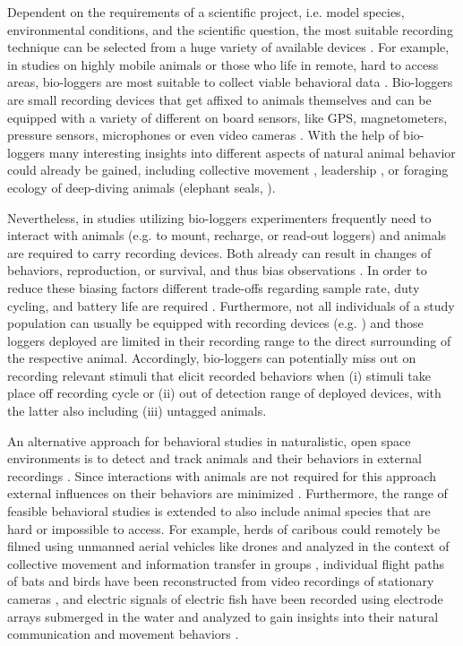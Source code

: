 \documentclass[11pt,pdftex]{article}
\begin{document}
Dependent on the requirements of a scientific project, i.e. model species, environmental conditions, and the scientific question, the most suitable recording technique can be selected from a huge variety of available devices \citep{Hughey2018}. For example, in studies on highly mobile animals or those who life in remote, hard to access areas, bio-loggers are most suitable to collect viable behavioral data \citep{Nagy2010, StrandburgPeshkin2017}. Bio-loggers are small recording devices that get affixed to animals themselves and can be equipped with a variety of different on board sensors, like GPS, magnetometers, pressure sensors, microphones or even video cameras \citep{Hughey2018}. With the help of bio-loggers many interesting insights into different aspects of natural animal behavior could already be gained, including collective movement \citep{Nagy2010, Strandburg2015}, leadership \citep{Strandburg2018}, or foraging ecology of deep-diving animals (elephant seals, \citealp{Robinson2012}).

Nevertheless, in studies utilizing bio-loggers experimenters frequently need to interact with animals (e.g. to mount, recharge, or read-out loggers) and animals are required to carry recording devices. Both already can result in changes of behaviors, reproduction, or survival, and thus bias observations \citep{Saraux2011}. In order to reduce these biasing factors different trade-offs regarding sample rate, duty cycling, and battery life are required \citep{StrandburgPeshkin2017, Hughey2018}. Furthermore, not all individuals of a study population can usually be equipped with recording devices (e.g. \citealp{StrandburgPeshkin2019}) and those loggers deployed are limited in their recording range to the direct surrounding of the respective animal. Accordingly, bio-loggers can potentially miss out on recording relevant stimuli that elicit recorded behaviors when  (i) stimuli take place off recording cycle or (ii) out of detection range of deployed devices, with the latter also including (iii) untagged animals. 

An alternative approach for behavioral studies in naturalistic, open space environments is to detect and track animals and their behaviors in external recordings \citep{Kuhl2013, Hughey2018}. Since interactions with animals are not required for this approach external influences on their behaviors are minimized \citep{Saraux2011}. Furthermore, the range of feasible behavioral studies is extended to also include animal species that are hard or impossible to access. For example, herds of caribous could remotely be filmed using unmanned aerial vehicles like drones and analyzed in the context of collective movement and information transfer in groups \citep{Torney2018}, individual flight paths of bats and birds have been reconstructed from video recordings of stationary cameras \citep{Theriault2014}, and electric signals of electric fish have been recorded using electrode arrays submerged in the water and analyzed to gain insights into their natural communication and movement behaviors \citep{Henninger2018, Henninger2020}. 
\end{document}
